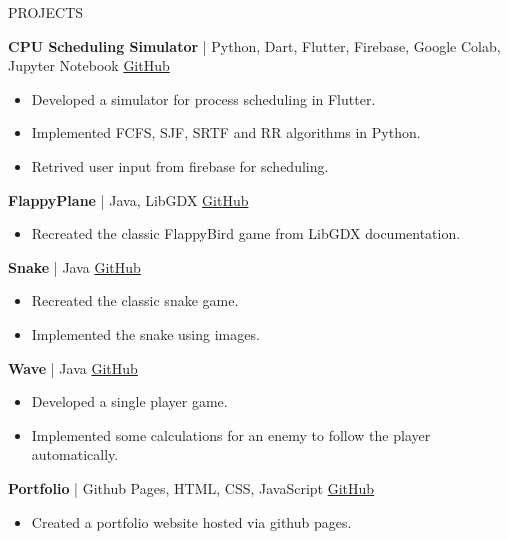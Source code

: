 \documentclass{resume} %
\begin{document}
\begin{rSection}{PROJECTS}
\vspace{-1.25em}
\item \textbf{CPU Scheduling Simulator} | {Python, Dart, Flutter, Firebase, Google Colab, Jupyter Notebook} \hfill \href{https://github.com/JayNakum/OperatingSystemsProject}{GitHub}
\begin{itemize}
    \itemsep -3pt {} 
    \item Developed a simulator for process scheduling in Flutter.
    \item Implemented FCFS, SJF, SRTF and RR algorithms in Python.
    \item Retrived user input from firebase for scheduling.
 \end{itemize}
\item \textbf{FlappyPlane} | {Java, LibGDX} \hfill \href{https://github.com/JayNakum/FlappyPlane}{GitHub}
\begin{itemize}
    \itemsep -3pt {} 
    \item Recreated the classic FlappyBird game from LibGDX documentation.
 \end{itemize}
\item \textbf{Snake} | {Java} \hfill \href{https://github.com/JayNakum/Snake}{GitHub}
\begin{itemize}
    \itemsep -3pt {} 
    \item Recreated the classic snake game.
    \item Implemented the snake using images.
 \end{itemize}
\item \textbf{Wave} | {Java} \hfill \href{https://github.com/JayNakum/Wave}{GitHub}
\begin{itemize}
    \itemsep -3pt {} 
    \item Developed a single player game.
    \item Implemented some calculations for an enemy to follow the player automatically.
 \end{itemize}
\item \textbf{Portfolio} | {Github Pages, HTML, CSS, JavaScript} \hfill \href{https://github.com/JayNakum/JayNakum.github.io}{GitHub}
\begin{itemize}
    \itemsep -3pt {} 
    \item Created a portfolio website hosted via github pages.

\end{itemize}
\end{rSection}
\end{document}
